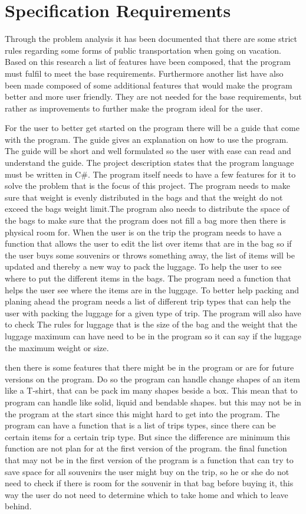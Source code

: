 \section{Specification Requirements}
\label{sec:Spec}
Through the problem analysis it has been documented that there are some strict rules regarding some forms of public transportation when going on vacation. Based on this research a list of features have been composed, that the program must fulfil to meet the base requirements.
Furthermore another list have also been made composed of some additional features that would make the program better and more user friendly. They are not needed for the base requirements, but rather as improvements to further make the program ideal for the user.

For the user to better get started on the program there will be a guide that come with the program. The guide gives an explanation on how to use the program. The guide will be short and well formulated so the user with ease can read and understand the guide.
The project description states that the program language must be written in C#.
The program itself needs to have a few features  for it to solve the problem that is  the focus of this project. The program needs to make sure that weight is evenly distributed in the bags and that the weight do not exceed the bags weight limit.The program also needs to distribute the space of the bags to make sure that the program does not fill a bag more then there is physical room for.
When the user is on the trip the program needs to have a function that allows the user to edit the list over items that are in the bag so if the user buys some souvenirs or throws something away, the list of items will be updated and thereby a new way to pack the luggage.
To help the user to see where to put the different items in the bags. The program need a function that helps the user see where the items are in the luggage. To better help packing and planing ahead the program needs a list of different trip types that can help the user with packing the luggage for a given type of trip.
The program will also have to check
The rules for luggage that is the size of the bag and the weight that the luggage maximum can have need to be in the program so it can say if the luggage the maximum weight or size.


then there is some features that there might be in the program or are for future versions on the program. Do so the program can handle change shapes of an item like a T-shirt, that can be pack im many shapes beside a box. This mean that to program can handle like solid, liquid and bendable shapes. but this may not be in the program at the start since this might hard to get into the program.
The program can have a function that is a list of trips types, since there can be certain items for a certain trip type. But since the difference are minimum this function are not plan for at the first version of the program.
the final function that may not be in the first version of the program is a function that can try to save space for all souvenirs the user might buy on the trip, so he or she do not need to check if there is room for the souvenir in that bag before buying it, this way the user do not need to determine which to take home and which to leave behind.

